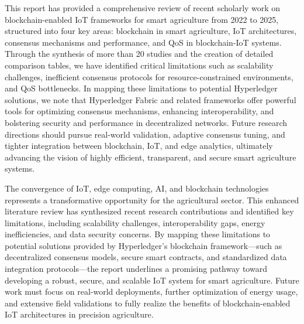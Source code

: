 \documentclass[12pt,onecolumn]{IEEEtran} %
\begin{document}
This report has provided a comprehensive review of recent scholarly work on blockchain-enabled IoT frameworks for smart agriculture from 2022 to 2025, structured into four key areas: blockchain in smart agriculture, IoT architectures, consensus mechanisms and performance, and QoS in blockchain-IoT systems. Through the synthesis of more than 20 studies and the creation of detailed comparison tables, we have identified critical limitations such as scalability challenges, inefficient consensus protocols for resource-constrained environments, and QoS bottlenecks. In mapping these limitations to potential Hyperledger solutions, we note that Hyperledger Fabric and related frameworks offer powerful tools for optimizing consensus mechanisms, enhancing interoperability, and bolstering security and performance in decentralized networks. Future research directions should pursue real-world validation, adaptive consensus tuning, and tighter integration between blockchain, IoT, and edge analytics, ultimately advancing the vision of highly efficient, transparent, and secure smart agriculture systems.

The convergence of IoT, edge computing, AI, and blockchain technologies represents a transformative opportunity for the agricultural sector. This enhanced literature review has synthesized recent research contributions \cite{atalla2023iotenabledprecisionagriculture, akhter2022precisionagricultureusing, atalla2023iotenabledprecisionagriculture, bayih2022utilizationofinternet, ouafiq2022datamanagementand} and identified key limitations, including scalability challenges, interoperability gaps, energy inefficiencies, and data security concerns. By mapping these limitations to potential solutions provided by Hyperledger’s blockchain framework—such as decentralized consensus models, secure smart contracts, and standardized data integration protocols—the report underlines a promising pathway toward developing a robust, secure, and scalable IoT system for smart agriculture. Future work must focus on real-world deployments, further optimization of energy usage, and extensive field validations to fully realize the benefits of blockchain-enabled IoT architectures in precision agriculture.
\end{document}
